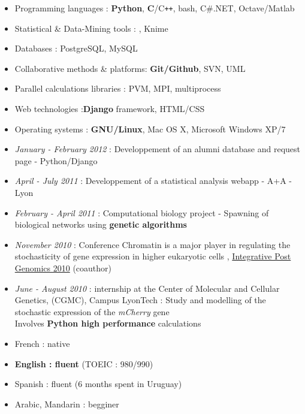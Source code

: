 
\begin{itemize}
\renewcommand{\labelitemi}{$\circ$}
    \item Programming languages : \textbf{Python}, \textbf{C}/C{\tt ++}, bash, C\#.NET, Octave/Matlab
    \item Statistical \& Data-Mining tools : \Rlogo, Knime
    \item Databases : PostgreSQL, MySQL
    \item Collaborative methods \& platforms: \textbf{Git/Github}, SVN, UML
    \item Parallel calculations libraries : PVM, MPI, multiprocess
    \item Web technologies :\textbf{Django} framework, HTML/CSS
    \item Operating systems : \textbf{GNU/Linux}, Mac OS X, Microsoft Windows XP/7
\end{itemize}


\begin{itemize}
\renewcommand{\labelitemi}{$\circ$}
	\item \emph{January - February 2012} : Developpement of an alumni database and request page - Python/Django
	\item \emph{April - July 2011} : Developpement of a statistical analysis webapp - A+A - Lyon
	\item \textit{February - April 2011} : Computational biology project - Spawning of biological networks using \textbf{genetic algorithms}
    \item \textit{November 2010} : Conference \og Chromatin is a major player in regulating the stochasticity of gene expression in higher eukaryotic cells \fg{}, \href{http://ipg.insa-lyon.fr/}{Integrative Post Genomics 2010} (coauthor)
    \item \textit{June - August 2010} : internship at the Center of Molecular and Cellular Genetics, (CGMC), Campus LyonTech : \og Study and modelling of the stochastic expression of the \textit{mCherry} gene\fg{} \\Involves \textbf{Python high performance} calculations
\end{itemize}


    \begin{itemize}
    \renewcommand{\labelitemi}{$\circ$}
    \item French : native
    \item \textbf{English : fluent} (TOEIC : 980/990)
    \item Spanish : fluent (6 months spent in Uruguay) 
    \item Arabic, Mandarin : begginer
\end{itemize}
    
